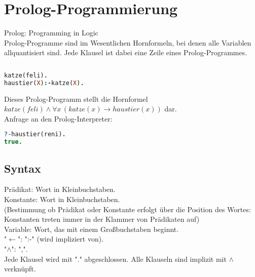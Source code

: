 \chapter{Prolog-Programmierung}
Prolog: Programming in Logic\\
Prolog-Programme sind im Wesentlichen Hornformeln, bei denen alle Variablen allquantisiert sind. Jede Klausel ist dabei eine Zeile eines Prolog-Programmes.

$ $
\begin{lstlisting}[language=Prolog]
katze(feli).
haustier(X):-katze(X).
\end{lstlisting}
Dieses Prolog-Programm stellt die Hornformel $katze(feli) \wedge \forall x \, (katze(x) \to haustier(x))$ dar.\\
Anfrage an den Prolog-Interpreter:
\begin{lstlisting}[language=Prolog]
?-haustier(reni).
true.
\end{lstlisting}

\section{Syntax}
Prädikat: Wort in Kleinbuchstaben.\\
Konstante: Wort in Kleinbuchstaben.\\
(Bestimmung ob Prädikat oder Konstante erfolgt über die Position des Wortes: Konstanten treten immer in der Klammer von Prädikaten auf)\\
Variable: Wort, das mit einem Großbuchstaben beginnt.\\
"$\leftarrow$": ":-" (wird impliziert von).\\
"$\wedge$": ",".\\
Jede Klausel wird mit "." abgeschlossen. Alle Klauseln sind implizit mit $\wedge$ verknüpft.











